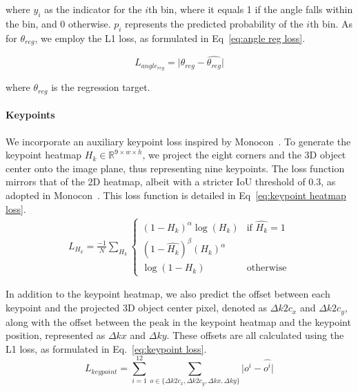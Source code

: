\documentclass[journal]{IEEEtran}
\newcommand{\R}{\mathbb{R}}
\begin{document}
	where $y_i$ as the indicator for the $i$th bin, where it equals 1 if the angle falls within the bin, and 0 otherwise. $p_i$ represents the predicted probability of the $i$th bin. As for $\theta_{reg}$, we employ the L1 loss, as formulated in Eq~\eqref{eq:angle reg loss}.
	
	
	\begin{equation} 
		L_{angle_{reg}} = \lvert \theta_{reg} - \hat{\theta_{reg}} \rvert
		\label{eq:angle reg loss}
	\end{equation}

	where $\hat{\theta_{reg}}$ is the regression target.
	
	\paragraph{Keypoints}
	We incorporate an auxiliary keypoint loss inspired by Monocon~\cite{monocon}. To generate the keypoint heatmap $H_k \in \R^{9 \times w \times h}$, we project the eight corners and the 3D object center onto the image plane, thus representing nine keypoints. The loss function mirrors that of the 2D heatmap, albeit with a stricter IoU threshold of 0.3, as adopted in Monocon~\cite{monocon}. This loss function is detailed in Eq~\eqref{eq:keypoint heatmap loss}.
	\begin{equation}
	\begin{split}
		L_{H_k}=\frac{-1}N\sum_{H_k}\begin{cases}(1-H_k)^\alpha\log(H_k)&\text{if }\hat{H_k}=1\\(1-\hat{H_k})^\beta({H_k})^\alpha \\ \log(1-{H_k}) &\text{otherwise}\end{cases}
		\label{eq:keypoint heatmap loss}
	\end{split}
	\end{equation}
	
	In addition to the keypoint heatmap, we also predict the offset between each keypoint and the projected 3D object center pixel, denoted as $\Delta k2c_x$ and $\Delta k2c_y$, along with the offset between the peak in the keypoint heatmap and the keypoint position, represented as $\Delta kx$ and $\Delta ky$. These offsets are all calculated using the L1 loss, as formulated in Eq.~\eqref{eq:keypoint loss}.
	\begin{equation}
		L_{keypoint} = \sum_{i=1}^{12}\sum_{o\in \{\Delta k2c_x, \Delta k2c_y, \Delta kx, \Delta ky\}}\lvert o^i - \hat{o^i} \rvert
		\label{eq:keypoint loss}
	\end{equation}
	
\end{document}
